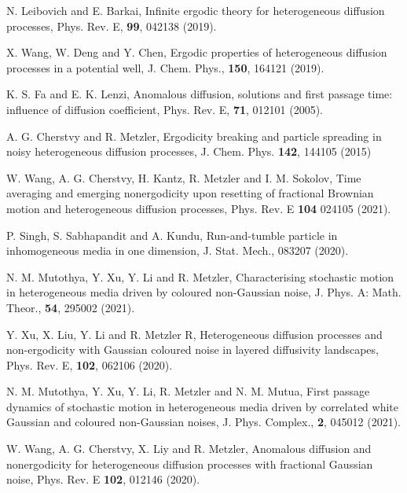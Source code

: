 \documentclass[showpacs,amsmath,amssymb,aps,pre,twocolumn,]{revtex4-1}
\def\greenw#1{{\color{black} #1}}
\begin{document}
\begin{thebibliography}{}
N. Leibovich and E. Barkai, Infinite ergodic theory for heterogeneous diffusion processes, Phys. Rev. E, \textbf{99}, 042138 (2019).

X. Wang, W. Deng and Y. Chen, Ergodic properties of heterogeneous diffusion processes in a potential well, J. Chem. Phys., \textbf{150}, 164121 (2019).

K. S. Fa and E. K. Lenzi, Anomalous diffusion, solutions and first passage time: influence of diffusion coefficient, Phys. Rev. E, \textbf{71}, 012101 (2005).


\greenw{A. G. Cherstvy and R. Metzler, Ergodicity breaking and particle spreading in noisy heterogeneous
diffusion processes, J. Chem. Phys. \textbf{142}, 144105 (2015)}


W. Wang, A. G. Cherstvy, H. Kantz, R. Metzler and I. M. Sokolov, Time averaging and emerging nonergodicity upon resetting of fractional Brownian motion and heterogeneous diffusion processes, Phys. Rev. E \textbf{104} 024105 (2021).

P. Singh, S. Sabhapandit and A. Kundu, Run-and-tumble particle in inhomogeneous media in one dimension, J. Stat. Mech., 083207 (2020).


N. M. Mutothya, Y. Xu, Y. Li and R. Metzler, Characterising stochastic motion in heterogeneous media driven by coloured
non-Gaussian noise, J. Phys. A: Math. Theor., \textbf{54}, 295002 (2021).

Y. Xu, X. Liu, Y. Li and R. Metzler R, Heterogeneous diffusion processes and non-ergodicity with Gaussian coloured noise in
layered diffusivity landscapes, Phys. Rev. E, \textbf{102}, 062106 (2020).





N. M. Mutothya, Y. Xu, Y. Li, R. Metzler and N. M. Mutua, First passage dynamics of stochastic motion in heterogeneous media driven by correlated white Gaussian and coloured non-Gaussian noises, J. Phys. Complex., \textbf{2}, 045012 (2021).

W. Wang, A. G. Cherstvy, X. Liy and R. Metzler, Anomalous diffusion and nonergodicity for heterogeneous diffusion processes with fractional Gaussian noise, Phys. Rev. E \textbf{102}, 012146 (2020).


\end{thebibliography}
\end{document}
